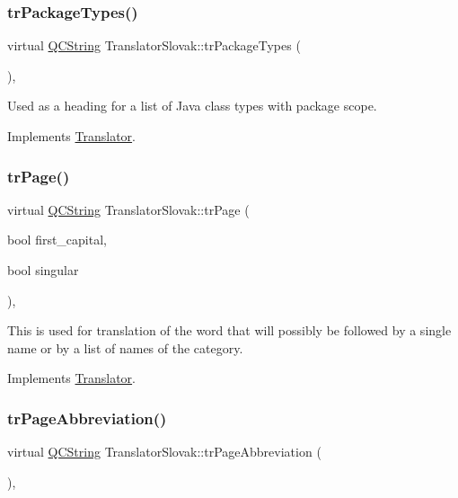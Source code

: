 \subsubsection{\texorpdfstring{trPackageTypes()}{trPackageTypes()}}
{\footnotesize\ttfamily virtual \mbox{\hyperlink{class_q_c_string}{Q\+C\+String}} Translator\+Slovak\+::tr\+Package\+Types (\begin{DoxyParamCaption}{ }\end{DoxyParamCaption})\hspace{0.3cm}{\ttfamily [inline]}, {\ttfamily [virtual]}}

Used as a heading for a list of Java class types with package scope. 

Implements \mbox{\hyperlink{class_translator}{Translator}}.

\mbox{\label{class_translator_slovak_aaf33081f6b67bff4e435e933047070ed}} 
\subsubsection{\texorpdfstring{trPage()}{trPage()}}
{\footnotesize\ttfamily virtual \mbox{\hyperlink{class_q_c_string}{Q\+C\+String}} Translator\+Slovak\+::tr\+Page (\begin{DoxyParamCaption}\item[{bool}]{first\+\_\+capital,  }\item[{bool}]{singular }\end{DoxyParamCaption})\hspace{0.3cm}{\ttfamily [inline]}, {\ttfamily [virtual]}}

This is used for translation of the word that will possibly be followed by a single name or by a list of names of the category. 

Implements \mbox{\hyperlink{class_translator}{Translator}}.

\mbox{\label{class_translator_slovak_a4fbfecb6f1c82f3203fdd2e506e46df1}} 
\subsubsection{\texorpdfstring{trPageAbbreviation()}{trPageAbbreviation()}}
{\footnotesize\ttfamily virtual \mbox{\hyperlink{class_q_c_string}{Q\+C\+String}} Translator\+Slovak\+::tr\+Page\+Abbreviation (\begin{DoxyParamCaption}{ }\end{DoxyParamCaption})\hspace{0.3cm}{\ttfamily [inline]}, {\ttfamily [virtual]}}

